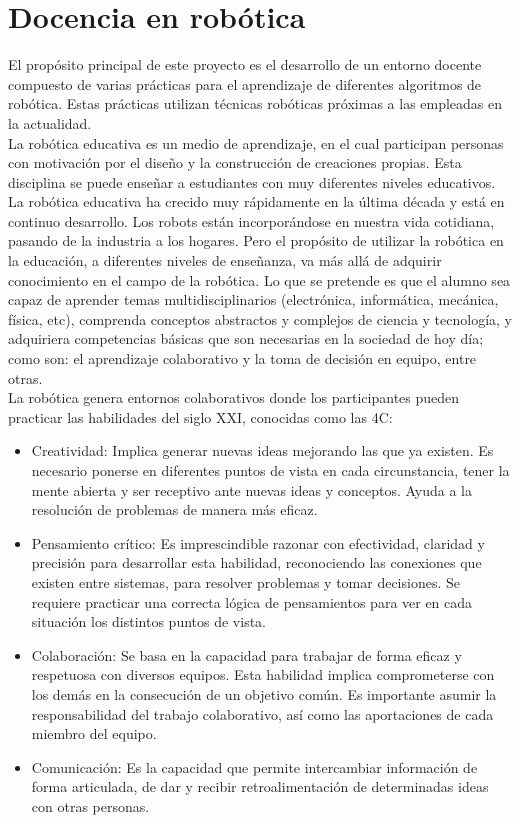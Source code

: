 \section{Docencia en robótica}
El propósito principal de este proyecto es el desarrollo de un entorno docente compuesto de varias prácticas para el aprendizaje de diferentes algoritmos de robótica. Estas prácticas utilizan técnicas robóticas próximas a las empleadas en la actualidad.\\

La robótica educativa es un medio de aprendizaje, en el cual participan personas con motivación por el diseño y la construcción de creaciones propias. Esta disciplina se puede enseñar a estudiantes con muy diferentes niveles educativos.\\

La robótica educativa ha crecido muy rápidamente en la última década y está en continuo desarrollo. Los robots están incorporándose en nuestra vida cotidiana, pasando de la industria a los hogares. Pero el propósito de utilizar la robótica en la educación, a diferentes niveles de enseñanza, va más allá de adquirir conocimiento en el campo de la robótica. Lo que se pretende es que el alumno sea capaz de aprender temas multidisciplinarios (electrónica, informática, mecánica, física, etc), comprenda conceptos abstractos y complejos de ciencia y tecnología, y adquiriera competencias básicas que son necesarias en la sociedad de hoy día; como son: el aprendizaje colaborativo y la toma de decisión en equipo, entre otras.\\

La robótica genera entornos colaborativos donde los participantes pueden practicar las habilidades del siglo XXI, conocidas como las 4C:

\begin{itemize}
\item Creatividad: Implica generar nuevas ideas mejorando las que ya existen. Es necesario ponerse en diferentes puntos de vista en cada circunstancia, tener la mente abierta y ser receptivo ante nuevas ideas y conceptos. Ayuda a la resolución de problemas de manera más eficaz.
\item Pensamiento crítico: Es imprescindible razonar con efectividad, claridad y precisión para desarrollar esta habilidad, reconociendo las conexiones que existen entre sistemas, para resolver problemas y tomar decisiones. Se requiere practicar una correcta lógica de pensamientos para ver en cada situación los distintos puntos de vista.
\item Colaboración: Se basa en la capacidad para trabajar de forma eficaz y respetuosa con diversos equipos. Esta habilidad implica comprometerse con los demás en la consecución de un objetivo común. Es importante asumir la responsabilidad del trabajo colaborativo, así como las aportaciones de cada miembro del equipo.
\item Comunicación: Es la capacidad que permite intercambiar información de forma articulada, de dar y recibir retroalimentación de determinadas ideas con otras personas.
\end{itemize}

